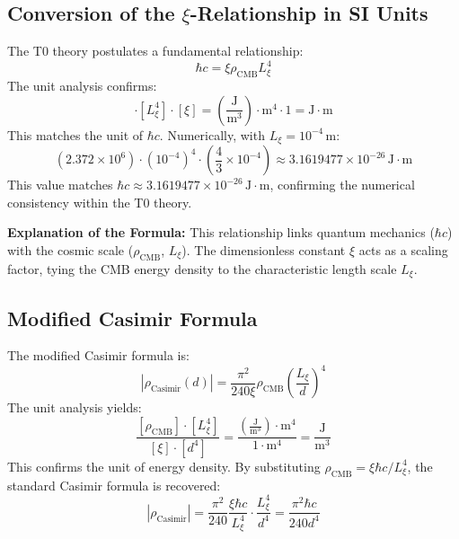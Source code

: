 \documentclass{article}
\begin{document}
	\subsection{Conversion of the $\xi$-Relationship in SI Units}
	The T0 theory postulates a fundamental relationship:
	\begin{equation}
		\hbar c = \xi \rho_{\text{CMB}} L_\xi^4
	\end{equation}
	The unit analysis confirms:
	\begin{equation}
		[\rho_{\text{CMB}}] \cdot [L_\xi^4] \cdot [\xi] = \left( \frac{\text{J}}{\text{m}^3} \right) \cdot \text{m}^4 \cdot 1 = \text{J} \cdot \text{m}
	\end{equation}
	This matches the unit of $\hbar c$. Numerically, with $L_\xi = 10^{-4} \, \text{m}$:
	\begin{equation}
		\left( 2.372 \times 10^6 \right) \cdot \left( 10^{-4} \right)^4 \cdot \left( \frac{4}{3} \times 10^{-4} \right) \approx 3.1619477 \times 10^{-26} \, \text{J} \cdot \text{m}
	\end{equation}
	This value matches $\hbar c \approx 3.1619477 \times 10^{-26} \, \text{J} \cdot \text{m}$, confirming the numerical consistency within the T0 theory.
	
	\textbf{Explanation of the Formula:} This relationship links quantum mechanics ($\hbar c$) with the cosmic scale ($\rho_{\text{CMB}}$, $L_\xi$). The dimensionless constant $\xi$ acts as a scaling factor, tying the CMB energy density to the characteristic length scale $L_\xi$.
	
	\subsection{Modified Casimir Formula}
	The modified Casimir formula is:
	\begin{equation}
		|\rho_{\text{Casimir}}(d)| = \frac{\pi^2}{240 \xi} \rho_{\text{CMB}} \left( \frac{L_\xi}{d} \right)^4
	\end{equation}
	The unit analysis yields:
	\begin{equation}
		\frac{[\rho_{\text{CMB}}] \cdot [L_\xi^4]}{[\xi] \cdot [d^4]} = \frac{\left( \frac{\text{J}}{\text{m}^3} \right) \cdot \text{m}^4}{1 \cdot \text{m}^4} = \frac{\text{J}}{\text{m}^3}
	\end{equation}
	This confirms the unit of energy density. By substituting $\rho_{\text{CMB}} = \xi \hbar c / L_\xi^4$, the standard Casimir formula is recovered:
	\begin{equation}
		|\rho_{\text{Casimir}}| = \frac{\pi^2}{240} \frac{\xi \hbar c}{L_\xi^4} \cdot \frac{L_\xi^4}{d^4} = \frac{\pi^2 \hbar c}{240 d^4}
	\end{equation}
	
\end{document}
